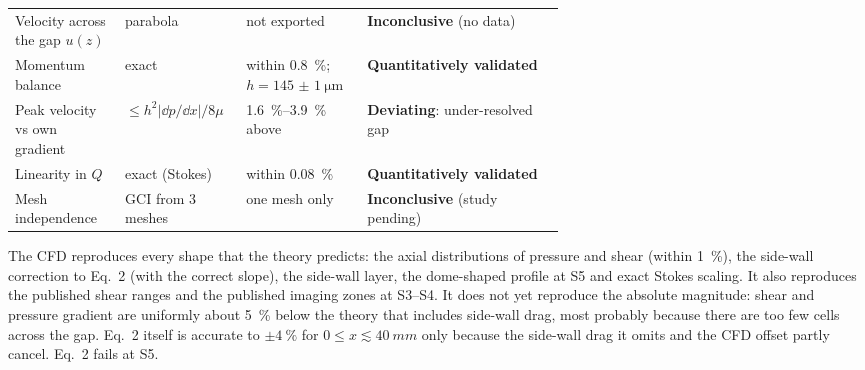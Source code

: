 \begin{table}[htbp]
\begin{tabularx}{\linewidth}{@{}p{0.2\linewidth}p{0.22\linewidth}p{0.22\linewidth}X@{}}
Velocity across the gap $u(z)$ & parabola & not exported & \textbf{Inconclusive} (no data)\\
Momentum balance & exact & within \SI{0.8}{\percent}; $h=\SI{145(1)}{\micro\metre}$ & \textbf{Quantitatively validated}\\
Peak velocity vs own gradient & $\le h^2|\dd p/\dd x|/8\mu$ & \SIrange{1.6}{3.9}{\percent} above & \textbf{Deviating}: under-resolved gap\\
Linearity in $Q$ & exact (Stokes) & within \SI{0.08}{\percent} & \textbf{Quantitatively validated}\\
Mesh independence & GCI from 3 meshes & one mesh only & \textbf{Inconclusive} (study pending)\\
\bottomrule
\end{tabularx}
\end{table}

\begin{keybox}[Answer to RQ1--RQ3]
The CFD reproduces every shape that the theory predicts: the axial distributions of pressure and shear (within \SI{1}{\percent}), the side-wall correction to Eq.~2 (with the correct slope), the side-wall layer, the dome-shaped profile at S5 and exact Stokes scaling. It also reproduces the published shear ranges and the published imaging zones at S3--S4. It does not yet reproduce the absolute magnitude: shear and pressure gradient are uniformly about \SI{5}{\percent} below the theory that includes side-wall drag, most probably because there are too few cells across the gap. Eq.~2 itself is accurate to $\pm\SI{4}{\percent}$ for $0\le x\lesssim\SI{40}{mm}$ only because the side-wall drag it omits and the CFD offset partly cancel. Eq.~2 fails at S5.
\end{keybox}
